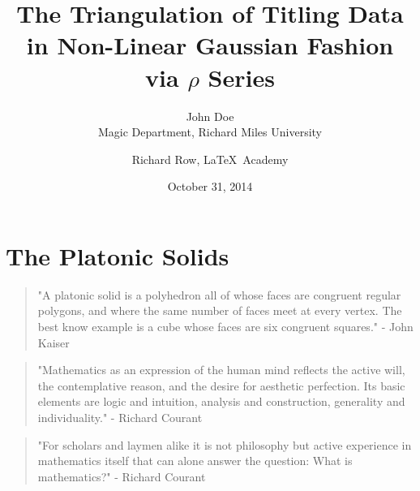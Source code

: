 \documentclass[openany,a4paper,12pt]{book}
\title{The Triangulation of Titling Data in Non-Linear Gaussian Fashion via $\rho$ Series}
\date{October 31, 2014}
\author{John Doe\\ Magic Department, Richard Miles University \and Richard Row, \LaTeX\ Academy}
\begin{document}

\maketitle
\tableofcontents
\chapter{The Platonic Solids}
\begin{quotation}"A platonic solid is a polyhedron all of whose faces are congruent regular polygons, and where the same number of faces meet at every vertex. The best know example is a cube whose faces are six congruent squares." - John Kaiser
\end{quotation}
\begin{quotation}"Mathematics as an expression of the human mind reflects the active will, the contemplative reason, and the desire for aesthetic perfection. Its basic elements are logic and intuition, analysis and construction, generality and individuality." - Richard Courant
\end{quotation}
\begin{quotation}"For scholars and laymen alike it is not philosophy but active experience in mathematics itself that can alone answer the question: What is mathematics?" - Richard Courant
\end{quotation}
\newpage
\end{document}
